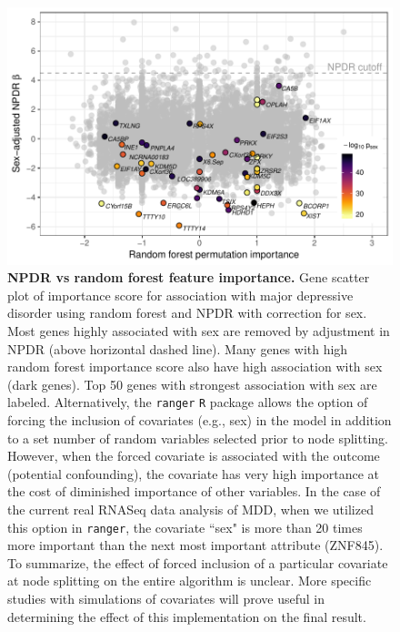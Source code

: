 \documentclass{article}
\begin{document}
\begin{figure}[!tpb]%
\centerline{\includegraphics[]{../figs/mostafavi_npdr_rf_mdd.pdf}}
\caption{{\bf NPDR vs random forest feature importance.}
Gene scatter plot of importance score for association with major depressive disorder using random forest and NPDR with correction for sex. Most genes highly associated with sex are removed by adjustment in NPDR (above horizontal dashed line). Many genes with high random forest importance score also have high association with sex (dark genes). Top 50 genes with strongest association with sex are labeled. Alternatively, the \texttt{ranger} \texttt{R} package allows the option of forcing the inclusion of covariates (e.g., sex) in the model in addition to a set number of random variables selected prior to node splitting. However, when the forced covariate is associated with the outcome (potential confounding), the covariate has very high importance at the cost of diminished importance of other variables. In the case of the current real RNASeq data analysis of MDD, when we utilized this option in \texttt{ranger}, the covariate ``sex" is more than 20 times more important than the next most important attribute (ZNF845). To summarize, the effect of forced inclusion of a particular covariate at node splitting on the entire algorithm is unclear. More specific studies with simulations of covariates will prove useful in determining the effect of this implementation on the final result.}
\label{fig:mostafavi_npdr_rf_mdd}
\end{figure}
\end{document}
